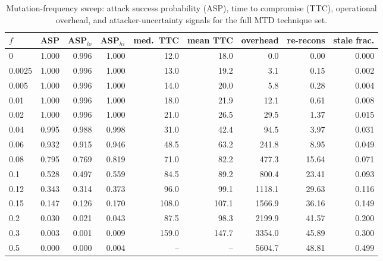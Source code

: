 \begin{table}[t]
\centering
\caption{Mutation-frequency sweep: attack success probability (ASP), time to compromise (TTC), operational overhead, and attacker-uncertainty signals for the full MTD technique set.}
\label{tab:frequency_sweep}
\begin{tabular}{lrrrrrrrr}
\toprule
$f$ & ASP & ASP$_{lo}$ & ASP$_{hi}$ & med.\ TTC & mean TTC & overhead & re-recons & stale frac. \\
\midrule
0 & 1.000 & 0.996 & 1.000 & 12.0 & 18.0 & 0.0 & 0.00 & 0.000 \\
0.0025 & 1.000 & 0.996 & 1.000 & 13.0 & 19.2 & 3.1 & 0.15 & 0.002 \\
0.005 & 1.000 & 0.996 & 1.000 & 14.0 & 20.0 & 5.8 & 0.28 & 0.004 \\
0.01 & 1.000 & 0.996 & 1.000 & 18.0 & 21.9 & 12.1 & 0.61 & 0.008 \\
0.02 & 1.000 & 0.996 & 1.000 & 21.0 & 26.5 & 29.5 & 1.37 & 0.015 \\
0.04 & 0.995 & 0.988 & 0.998 & 31.0 & 42.4 & 94.5 & 3.97 & 0.031 \\
0.06 & 0.932 & 0.915 & 0.946 & 48.5 & 63.2 & 241.8 & 8.95 & 0.049 \\
0.08 & 0.795 & 0.769 & 0.819 & 71.0 & 82.2 & 477.3 & 15.64 & 0.071 \\
0.1 & 0.528 & 0.497 & 0.559 & 84.5 & 89.2 & 800.4 & 23.41 & 0.093 \\
0.12 & 0.343 & 0.314 & 0.373 & 96.0 & 99.1 & 1118.1 & 29.63 & 0.116 \\
0.15 & 0.147 & 0.126 & 0.170 & 108.0 & 107.1 & 1566.9 & 36.16 & 0.149 \\
0.2 & 0.030 & 0.021 & 0.043 & 87.5 & 98.3 & 2199.9 & 41.57 & 0.200 \\
0.3 & 0.003 & 0.001 & 0.009 & 159.0 & 147.7 & 3354.0 & 45.89 & 0.300 \\
0.5 & 0.000 & 0.000 & 0.004 & -- & -- & 5604.7 & 48.81 & 0.499 \\
\bottomrule
\end{tabular}
\end{table}
